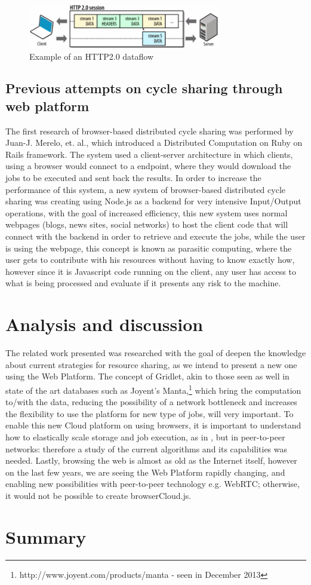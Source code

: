 \begin{figure}[htbp]
  \centering
  \includegraphics[width=0.75\textwidth]{img/http2dataflow.png}
  \caption{Example of an HTTP2.0 dataflow}
  \label{fig:http2dataflow}
\end{figure}


\subsection{Previous attempts on cycle sharing through web platform}
The first research of browser-based distributed cycle sharing was performed by Juan-J. Merelo, et. al., which introduced a Distributed Computation on Ruby on Rails framework\cite{Merelo2007}. The system used a client-server architecture in which clients, using a browser would connect to a endpoint, where they would download the jobs to be executed and sent back the results. In order to increase the performance of this system, a new system\cite{Duda2013} of browser-based distributed cycle sharing was creating using Node.js as a backend for very intensive Input/Output operations\cite{Tilkov2010}, with the goal of increased efficiency, this new system uses normal webpages (blogs, news sites, social networks) to host the client code that will connect with the backend in order to retrieve and execute the jobs, while the user is using the webpage, this concept is known as parasitic computing\cite{Barabasi2001}, where the user gets to contribute with his resources without having to know exactly how, however since it is Javascript code running on the client, any user has access to what is being processed and evaluate if it presents any risk to the machine.

\section{Analysis and discussion}

The related work presented was researched with the goal of deepen the knowledge about current strategies for resource sharing, as we intend to present a new one using the Web Platform. The concept of Gridlet, akin to those seen as well in state of the art databases such as Joyent's Manta,\footnote{http://www.joyent.com/products/manta - seen in December 2013} which bring the computation to/with the data, reducing the possibility of a network bottleneck and increases the flexibility to use the platform for new type of jobs, will very important. To enable this new Cloud platform on using browsers, it is important to understand how to elastically scale storage and job execution, as in \cite{Silva2011}, but in peer-to-peer networks: therefore a study of the current algorithms and its capabilities was needed. Lastly, browsing the web is almost as old as the Internet itself, however on the last few years, we are seeing the Web Platform rapidly changing, and enabling new possibilities with peer-to-peer technology e.g. WebRTC; otherwise, it would not be possible to create browserCloud.js.

\section*{Summary}

